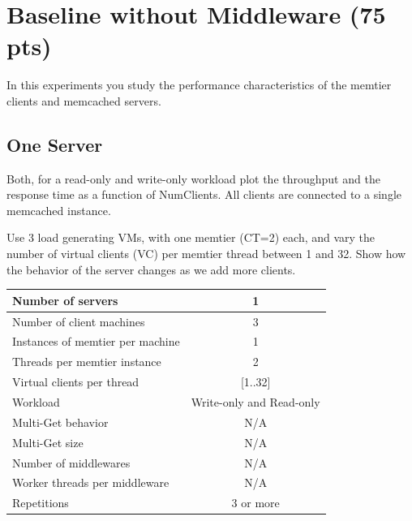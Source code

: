 \documentclass[11pt,a4paper]{article}
\begin{document}
\section{Baseline without Middleware (75 pts)}

In this experiments you study the performance characteristics of the memtier clients and memcached servers.

\subsection{One Server}

Both, for a read-only and write-only workload plot the throughput and the response time as a function of NumClients. All clients are connected to a single memcached instance.

Use 3 load generating VMs, with one memtier (CT=2) each, and vary the number of virtual clients (VC) per memtier thread between 1 and 32. Show how the behavior of the server changes as we add more clients.

\begin{center}
	\scriptsize{
		\begin{tabular}{|l|c|}
			\hline Number of servers                & 1                        \\
			\hline Number of client machines        & 3                        \\
			\hline Instances of memtier per machine & 1                        \\
			\hline Threads per memtier instance     & 2                        \\
			\hline Virtual clients per thread       & [1..32]                  \\
			\hline Workload                         & Write-only and Read-only \\
			\hline Multi-Get behavior               & N/A                      \\
			\hline Multi-Get size                   & N/A                      \\
			\hline Number of middlewares            & N/A                      \\
			\hline Worker threads per middleware    & N/A                      \\
			\hline Repetitions                      & 3 or more                \\
			\hline
		\end{tabular}
	}
\end{center}
\end{document}
